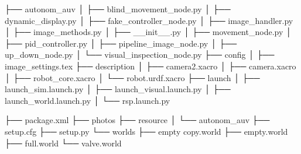 ├── autonom_auv
│ ├── blind_movement_node.py
│ ├── dynamic_display.py
│ ├── fake_controller_node.py
│ ├── image_handler.py
│ ├── image_methods.py
│ ├── __init__.py
│ ├── movement_node.py
│ ├── pid_controller.py
│ ├── pipeline_image_node.py
│ ├── up_down_node.py
│ └── visual_inspection_node.py
├── config
│ ├── image_settings.tex
├── description
│ ├── camera2.xacro
│ ├── camera.xacro
│ ├── robot_core.xacro
│ └── robot.urdf.xacro
├── launch
│ ├── launch_sim.launch.py
│ ├── launch_visual.launch.py
│ ├── launch_world.launch.py
│ └── rsp.launch.py


├── package.xml
├── photos
├── resource
│ └── autonom_auv
├── setup.cfg
├── setup.py
└── worlds
    ├── empty copy.world
    ├── empty.world
    ├── full.world
    └── valve.world
